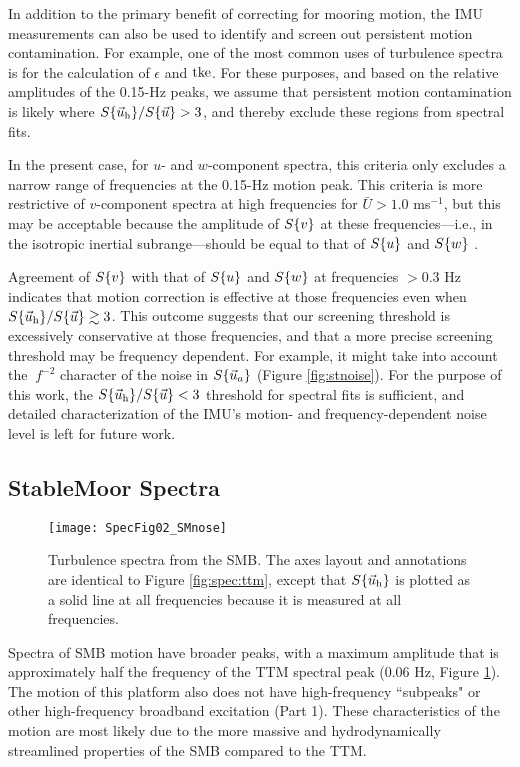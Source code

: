 In addition to the primary benefit of correcting for mooring motion, the IMU measurements can also be used to identify and screen out persistent motion contamination. For example, one of the most common uses of turbulence spectra is for the calculation of $\epsilon$ and $\mathrm{tke}$. For these purposes, and based on the relative amplitudes of the 0.15-Hz peaks, we assume that persistent motion contamination is likely where $S\{\vec{u}_{\mathrm{h}}\}/S\{\vec{u}\} > 3$, and thereby exclude these regions from spectral fits.

In the present case, for $u$- and $w$-component spectra, this criteria only excludes a narrow range of frequencies at the 0.15-Hz motion peak. This criteria is more restrictive of $v$-component spectra at high frequencies for $\bar U > 1.0$ ms$^{-1}$, but this may be acceptable because the amplitude of $S\{v\}$ at these frequencies---i.e., in the isotropic inertial subrange---should be equal to that of $S\{u\}$ and $S\{w\}$ \cite[]{Kolmogorov1941c}.

Agreement of $S\{v\}$ with that of $S\{u\}$ and $S\{w\}$ at frequencies $>0.3$ Hz indicates that motion correction is effective at those frequencies even when $S\{\vec{u}_{\mathrm{h}}\}/S\{\vec{u}\} \gtrsim 3$. This outcome suggests that our screening threshold is excessively conservative at those frequencies, and that a more precise screening threshold may be frequency dependent. For example, it might take into account the $~f^{-2}$ character of the noise in $S\{\vec{u}_a\}$ (Figure \ref{fig:stnoise}). For the purpose of this work, the $S\{\vec{u}_{\mathrm{h}}\}/S\{\vec{u}\} < 3$ threshold for spectral fits is sufficient, and detailed characterization of the IMU's motion- and frequency-dependent noise level is left for future work.

\subsection{StableMoor Spectra}

\begin{figure*}[th]
  \centering
  \texttt{[image: SpecFig02\_SMnose]}
  \caption{Turbulence spectra from the SMB. The axes layout and annotations are identical to Figure \ref{fig:spec:ttm}, except that $S\{\vec{u}_{\mathrm{h}}\}$ is plotted as a solid line at all frequencies because it is measured at all frequencies. }
  \label{fig:spec:sm}
\end{figure*}

Spectra of SMB motion have broader peaks, with a maximum amplitude that is approximately half the frequency of the TTM spectral peak (0.06 Hz, Figure \ref{fig:spec:sm}). The motion of this platform also does not have high-frequency ``subpeaks" or other high-frequency broadband excitation (Part 1).  These characteristics of the motion are most likely due to the more massive and hydrodynamically streamlined properties of the SMB compared to the TTM. 

